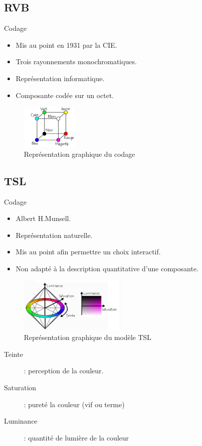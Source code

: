 \documentclass[14pt]{beamer}
\begin{document}
\subsection{RVB}
\begin{frame}{Codage \subsecname}
\begin{itemize}
\item Mis au point en 1931 par la CIE.
\item Trois rayonnements monochromatiques.
\item Représentation informatique.
\item Composante codée sur un octet.
\end{itemize}
\begin{figure}
\centering
\includegraphics[height=80px]{image_rgb}
\caption{Représentation graphique du codage}
\end{figure}
\end{frame}


\subsection{TSL}
\begin{frame}[allowframebreaks]{Codage \subsecname}
    \vfill
    \begin{itemize}
    \item Albert H.Munsell.
    \item Représentation naturelle.
    \item Mis au point afin permettre un choix interactif.
    \item Non adapté à la description quantitative d'une composante.
    \end{itemize}
    \vfill
    \begin{figure}
    \centering
    \includegraphics[height=100px]{image_tsl}
    \caption{Représentation graphique du modèle TSL}
    \end{figure}
    \begin{description}
    \item[Teinte]: perception de la couleur.
    \item[Saturation]: pureté la couleur (vif ou terme)
    \item[Luminance]: quantité de lumière de la couleur
    \end{description}
\end{frame}
\end{document}
